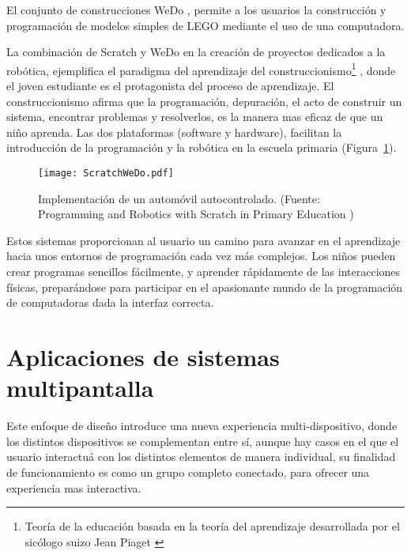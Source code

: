 El conjunto de construcciones WeDo \cite{WeDo}, permite a los usuarios la construcción y programación de modelos simples de LEGO mediante el uso de una computadora.

La combinación de Scratch y WeDo en la creación de proyectos dedicados a la robótica, ejemplifica el paradigma del aprendizaje del construccionismo\footnote{Teoría de la educación basada en la teoría del aprendizaje desarrollada por el sicólogo suizo Jean Piaget \cite{Piaget}} \cite{Papert}, donde el joven estudiante es el protagonista del proceso de aprendizaje. El construccionismo afirma que la programación, depuración, el acto de construir un sistema, encontrar problemas y resolverlos, es la manera mas eficaz de que un niño aprenda. Las dos plataformas (software y hardware), facilitan la introducción de la programación y la robótica en la escuela primaria (Figura~\ref{fig:ScratchWeDo}).

\begin{figure}[!h]
\begin{center}
\texttt{[image: ScratchWeDo.pdf]}
\caption{Implementación de un automóvil autocontrolado. (Fuente: Programming and Robotics with Scratch in Primary Education \cite{ScratchWeDo})}
\label{fig:ScratchWeDo}
\end{center}
\end{figure}



Estos sistemas proporcionan al usuario un camino para avanzar en el aprendizaje hacia unos entornos de programación cada vez más complejos. Los niños pueden crear programas sencillos fácilmente, y aprender rápidamente de las interacciones físicas, preparándose para participar en el apasionante mundo de la programación de computadoras dada la interfaz correcta.



\section{Aplicaciones de sistemas multipantalla}

Este enfoque de diseño introduce una nueva experiencia multi-dispositivo, donde los distintos dispositivos se complementan entre sí, aunque hay casos en el que el usuario interactuá con los distintos elementos de manera individual, su finalidad de funcionamiento es como un grupo completo conectado, para ofrecer una experiencia mas interactiva.

